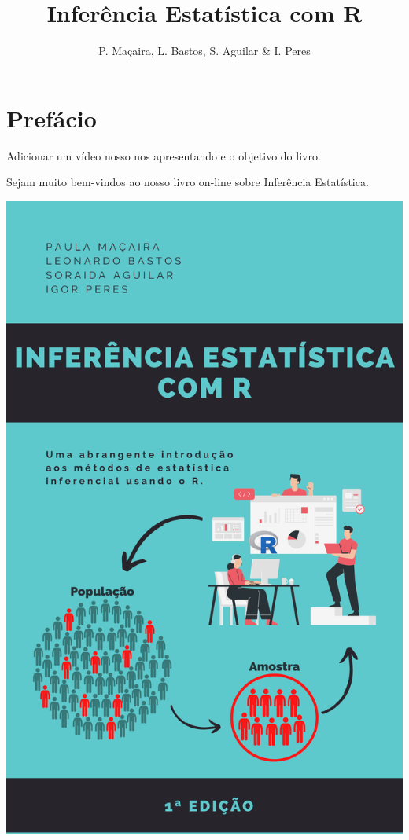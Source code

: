 \documentclass[
]{book}
\title{Inferência Estatística com R}
\author{P. Maçaira, L. Bastos, S. Aguilar \& I. Peres}
\date{}
\begin{document}
\maketitle

{
\setcounter{tocdepth}{1}
\tableofcontents
}
\hypertarget{prefuxe1cio}{%
\chapter*{Prefácio}\label{prefuxe1cio}}

Adicionar um vídeo nosso nos apresentando e o objetivo do livro.

Sejam muito bem-vindos ao nosso livro on-line sobre Inferência Estatística.

\includegraphics{cover.png}
\end{document}
